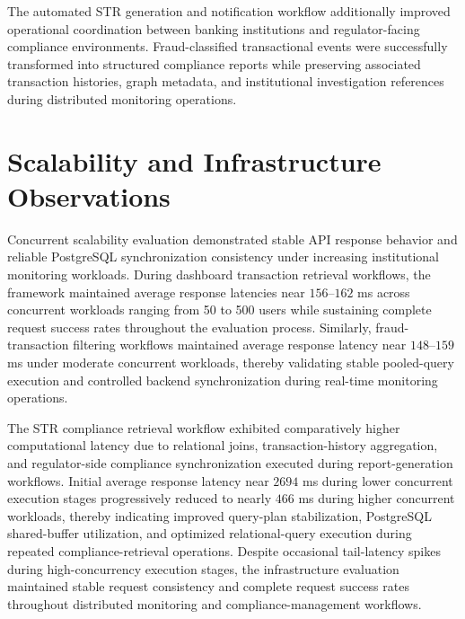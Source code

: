 The automated STR generation and notification workflow additionally improved operational coordination between banking institutions and regulator-facing compliance environments. Fraud-classified transactional events were successfully transformed into structured compliance reports while preserving associated transaction histories, graph metadata, and institutional investigation references during distributed monitoring operations.


\section[Scalability and Infrastructure Observations]
{\textbf{Scalability and Infrastructure Observations}}

Concurrent scalability evaluation demonstrated stable API response behavior and reliable PostgreSQL synchronization consistency under increasing institutional monitoring workloads. During dashboard transaction retrieval workflows, the framework maintained average response latencies near $156$--$162$ ms across concurrent workloads ranging from 50 to 500 users while sustaining complete request success rates throughout the evaluation process. Similarly, fraud-transaction filtering workflows maintained average response latency near $148$--$159$ ms under moderate concurrent workloads, thereby validating stable pooled-query execution and controlled backend synchronization during real-time monitoring operations.

The STR compliance retrieval workflow exhibited comparatively higher computational latency due to relational joins, transaction-history aggregation, and regulator-side compliance synchronization executed during report-generation workflows. Initial average response latency near $2694$ ms during lower concurrent execution stages progressively reduced to nearly $466$ ms during higher concurrent workloads, thereby indicating improved query-plan stabilization, PostgreSQL shared-buffer utilization, and optimized relational-query execution during repeated compliance-retrieval operations. Despite occasional tail-latency spikes during high-concurrency execution stages, the infrastructure evaluation maintained stable request consistency and complete request success rates throughout distributed monitoring and compliance-management workflows.


